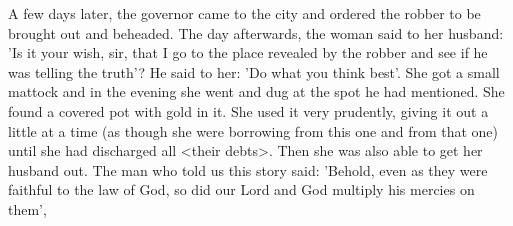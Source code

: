 A few days later, the governor came to the city and ordered the
robber to be brought out and beheaded.
The day afterwards, the
woman said to her husband: 'Is it your wish, sir, that I go to the
place revealed by the robber and see if he was telling the truth'? He
said to her: 'Do what you think best'.
She got a small mattock and
in the evening she went and dug at the spot he had mentioned.
She
found a covered pot with gold in it.
She used it very prudently,
giving it out a little at a time (as though she were borrowing from
this one and from that one) until she had discharged all <their
debts>.
Then she was also able to get her husband out.
The man
who told us this story said: 'Behold, even as they were faithful to
the law of God, so did our Lord and God multiply his mercies on
them',

